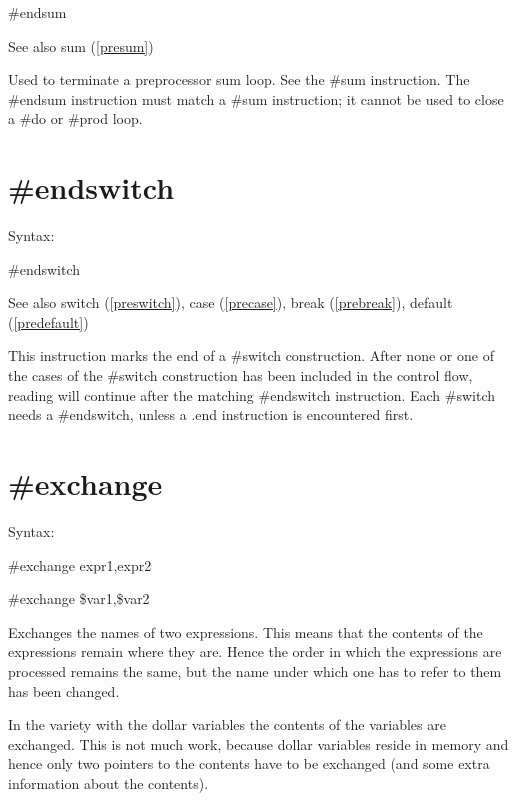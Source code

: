 \#endsum
 
\noindent See also sum (\ref{presum})

\noindent Used to terminate a preprocessor 
sum loop. See the \#sum instruction. The 
\#endsum instruction must match a \#sum instruction; it cannot be used to 
close a \#do or \#prod loop.


\section{\#endswitch}
\label{preendswitch}

\noindent Syntax:

\#endswitch
 
\noindent See also switch (\ref{preswitch}),
        case (\ref{precase}),
        break (\ref{prebreak}),
        default (\ref{predefault})

\noindent This instruction marks the end of a 
\#switch construction. After none or one of the cases of 
the \#switch construction has been included in the control flow, reading 
will continue after the matching \#endswitch instruction. Each \#switch 
needs a \#endswitch, unless a .end instruction is encountered first.


\section{\#exchange}
\label{preexchange}

\noindent Syntax:

\#exchange expr1,expr2

\#exchange \$var1,\$var2

\noindent Exchanges the names of two 
expressions. This means that the contents of the 
expressions remain where they are. Hence the order in which the expressions 
are processed remains the same, but the name under which one has to refer 
to them has been changed.

In the variety with the dollar variables the contents of 
the variables are exchanged. This is not much work, because dollar 
variables reside in memory and hence only two pointers to the contents have 
to be exchanged (and some extra information about the contents).

